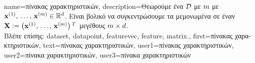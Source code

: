 {name={\foreignlanguage{greek}{πίνακας χαρακτηριστικών}}, 
	description={\foreignlanguage{greek}{Θεωρούμε ένα}  $\mathcal{D}$ 
		\foreignlanguage{greek}{με} $m$  \foreignlanguage{greek}{με}  
		${\bf x}^{(1)}, \,\ldots, \,{\bf x}^{(m)} \in \mathbb{R}^{d}$. 
		\foreignlanguage{greek}{Εί\-ναι βολικό να συγκεντρώσουμε τα μεμονωμένα}  
		 \foreignlanguage{greek}{σε έναν}   
		${\bf X} := \big({\bf x}^{(1)}, \,\ldots, \,{\bf x}^{(m)}\big)\,^{T}$ 
		\foreignlanguage{greek}{μεγέθους} $m \times d$.\\
		\foreignlanguage{greek}{Βλέπε επίσης:} \gls{dataset}, \gls{datapoint}, \gls{featurevec}, \gls{feature}, \gls{matrix}.},
	first={\foreignlanguage{greek}{πίνακας χαρακτηριστικών}},
	text={\foreignlanguage{greek}{πίνακας χαρακτηριστικών}},
	user1={\foreignlanguage{greek}{πίνακας χαρακτηριστικών}}, %
  	user2={\foreignlanguage{greek}{πίνακα χαρακτηριστικών}}, %
	user3={\foreignlanguage{greek}{πίνακα χαρακτηριστικών}} %
}

